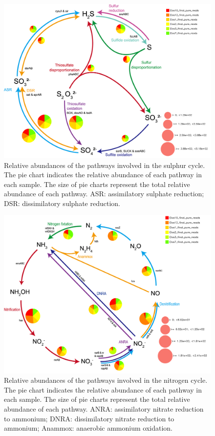    \begin{figure}[h]
      \centering
      \includegraphics[width=0.98\columnwidth]{figures/sulfur_cycle_karpathos.png}
      \caption[Relative abundances of the pathways involved in the sulphur cycle]{
         Relative abundances of the pathways involved in the sulphur cycle. 
         The pie chart indicates the relative abundance of each pathway in each sample. 
         The size of pie charts represent the total relative abundance of each pathway. 
         ASR: assimilatory sulphate reduction; DSR: dissimilatory sulphate reduction.
      }
      \label{fig:karpathos-sulfur}
   \end{figure}   


   \begin{figure}[h]
      \centering
      \includegraphics[width=0.98\columnwidth]{figures/nitrogen_cycle_karpathos.png}
      \caption[Relative abundances of the pathways involved in the nitrogen cycle]{
         Relative abundances of the pathways involved in the nitrogen cycle. 
         The pie chart indicates the relative abundance of each pathway in each sample. 
         The size of pie charts represent the total relative abundance of each pathway. 
         ANRA: assimilatory nitrate reduction to ammonium; 
         DNRA: dissimilatory nitrate reduction to ammonium; 
         Anammox: anaerobic ammonium oxidation. 
      }
      \label{fig:karpathos-nitrogen}
   \end{figure}   

